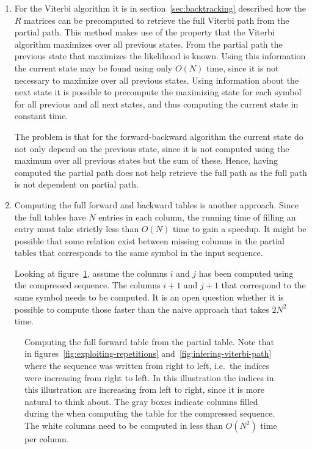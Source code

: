 \begin{enumerate}
\item For the Viterbi algorithm it is in section~\ref{sec:backtracking}
  described how the $R$ matrices can be precomputed to retrieve the full
  Viterbi path from the partial path. This method makes use of the property
  that the Viterbi algorithm maximizes over all previous states. From the
  partial path the previous state that maximizes the likelihood is known. Using
  this information the current state may be found using only $O(N)$ time, since
  it is not necessary to maximize over all previous states. Using information
  about the next state it is possible to precompute the maximizing state for
  each symbol for all previous and all next states, and thus computing the
  current state in constant time.

  The problem is that for the forward-backward algorithm the current state do
  not only depend on the previous state, since it is not computed using the
  maximum over all previous states but the sum of these. Hence, having computed
  the partial path does not help retrieve the full path as the full path is
  not dependent on partial path.
\item Computing the full forward and backward tables is another approach. Since
  the full tables have $N$ entries in each column, the running time of
  filling an entry must take strictly less than $O(N)$ time to gain a
  speedup. It might be possible that some relation exist between missing
  columns in the partial tables that corresponds to the same symbol in the
  input sequence.

  Looking at figure~\ref{fig:full-forward-table}, assume the columns $i$ and
  $j$ has been computed using the compressed sequence. The columns $i + 1$ and
  $j + 1$  that correspond to the same symbol needs to be computed. It is an
  open question whether it is possible to compute those faster than the naive
  approach that takes $2N^2$ time.
\end{enumerate}

\begin{figure}
  \centering
  
  \caption{Computing the full forward table from the partial table. Note that
    in figures~\ref{fig:exploiting-repetitions}
    and~\ref{fig:infering-viterbi-path} where the sequence was written from
    right to left, i.e.\ the indices were increasing from right to left. In
    this illustration the indices in this illustration are increasing from
    left to right, since it is more natural to think about. The gray boxes
    indicate columns filled during the when computing the table for the
    compressed sequence. The white columns need to be computed in less than
    $O(N^2)$ time per column.}
  \label{fig:full-forward-table}
\end{figure}

